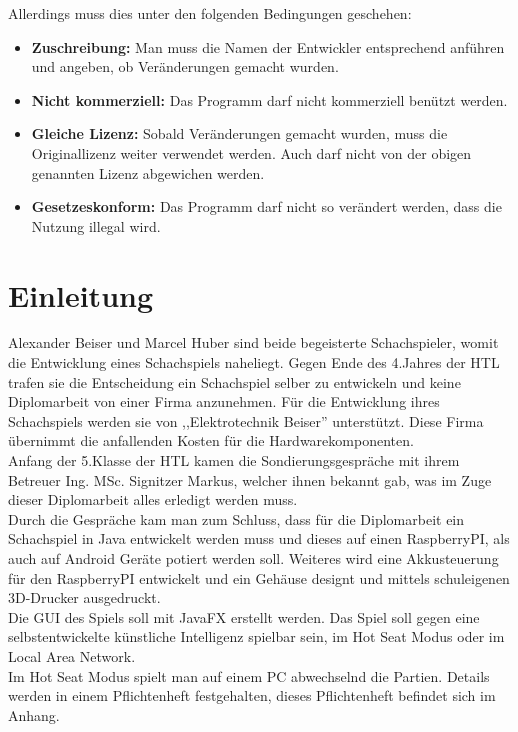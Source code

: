 \documentclass[12pt,a4paper]{article}
\begin{document}
{Allerdings muss dies unter den folgenden Bedingungen geschehen:
\begin{itemize}
	\item{\textbf{Zuschreibung:} Man muss die Namen der Entwickler entsprechend anführen und angeben, ob Veränderungen gemacht wurden.}
	\item{\textbf{Nicht kommerziell:} Das Programm darf nicht kommerziell benützt werden.}
	\item{\textbf{Gleiche Lizenz:} Sobald Veränderungen gemacht wurden, muss die Originallizenz weiter verwendet werden. Auch darf nicht von der obigen genannten Lizenz abgewichen werden.}
	\item{\textbf{Gesetzeskonform:} Das Programm darf nicht so verändert werden, dass die Nutzung illegal wird.}
\end{itemize}





\clearpage\vfill\newpage{}
\setcounter{section}{0}
\section{\sc Einleitung}
\label{SEC:INTRODUCTION}

	Alexander Beiser und Marcel Huber sind beide begeisterte Schachspieler, womit die Entwicklung eines Schachspiels naheliegt. Gegen Ende des 4.Jahres der HTL trafen sie die Entscheidung ein Schachspiel selber zu entwickeln und keine Diplomarbeit von einer Firma anzunehmen. Für die Entwicklung ihres Schachspiels werden sie von ,,Elektrotechnik Beiser'' unterstützt. Diese Firma übernimmt die anfallenden Kosten für die Hardwarekomponenten.\\
	Anfang der 5.Klasse der HTL kamen die Sondierungsgespräche mit ihrem Betreuer Ing. MSc. Signitzer Markus, 
welcher ihnen bekannt gab, was im Zuge dieser Diplomarbeit alles erledigt werden muss. \\
Durch die Gespräche kam man zum Schluss, dass für die Diplomarbeit ein Schachspiel in Java entwickelt werden muss und dieses auf einen RaspberryPI, als auch auf Android Geräte potiert werden soll. Weiteres wird eine Akkusteuerung für den RaspberryPI entwickelt und ein Gehäuse designt und mittels schuleigenen 3D-Drucker ausgedruckt. \\
	Die GUI des Spiels soll mit JavaFX erstellt werden. Das Spiel soll gegen eine selbstentwickelte künstliche Intelligenz spielbar sein, im Hot Seat Modus oder im Local Area Network. \\
	Im Hot Seat Modus spielt man auf einem PC abwechselnd die Partien.
	Details werden in einem Pflichtenheft festgehalten, dieses Pflichtenheft befindet sich im Anhang.
	
}
\end{document}
